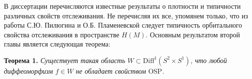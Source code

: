 \documentclass[12pt]{article}
\begin{document}
{%




В диссертации перечисляются известные результаты о плот\-ности и типичности различных свойств отслеживания. Не перечисляя их все, упомянем только, что из работы С.Ю. Пи\-люгина и О.Б. Пламеневской \cite{4} следует типичность орбитального свойс\-тва отслеживания в пространстве $H(M)$.
Основным результатом второй главы является следующая теорема:

\textbf{Теорема 1.} \textit{Существует такая область} $W\subset\mbox{Diff}^1(S^2\times S^1)$\textit{, что любой диффеоморфизм $f\in W$ не обладает свойством} OSP\textit{.}  

}
\end{document}
